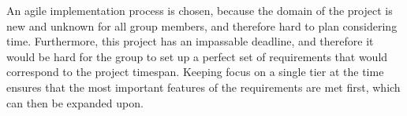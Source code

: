 An agile implementation process is chosen, because the domain of the project is new and unknown for all group members, and therefore hard to plan considering time. Furthermore, this project has an impassable deadline, and therefore it would be hard for the group to set up a perfect set of requirements that would correspond to the project timespan. Keeping focus on a single tier at the time ensures that the most important features of the requirements are met first, which can then be expanded upon.

































